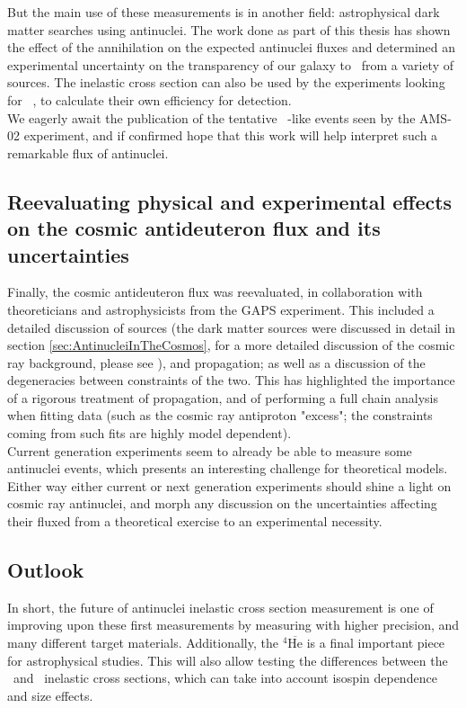 But the main use of these measurements is in another field: astrophysical dark matter searches using antinuclei. The work done as part of this thesis has shown the effect of the annihilation on the expected antinuclei fluxes and determined an experimental uncertainty on the transparency of our galaxy to \ahe\ from a variety of sources. The inelastic cross section can also be used by the experiments looking for \ahe\ , to calculate their own efficiency for detection. \\
We eagerly await the publication of the tentative \ahe\ -like events seen by the AMS-02 experiment, and if confirmed hope that this work will help interpret such a remarkable flux of antinuclei. \\

\subsection{Reevaluating physical and experimental effects on the cosmic antideuteron flux and its uncertainties}

Finally, the cosmic antideuteron flux was reevaluated, in collaboration with theoreticians and astrophysicists from the GAPS experiment. This included a detailed discussion of sources (the dark matter sources were discussed in detail in section \ref{sec:AntinucleiInTheCosmos}, for a more detailed discussion of the cosmic ray background, please see \cite{Serksnyte:2022onw}), and propagation; as well as a discussion of the degeneracies between constraints of the two. This has highlighted the importance of a rigorous treatment of propagation, and of performing a full chain analysis when fitting data (such as the cosmic ray antiproton "excess"; the constraints coming from such fits are highly model dependent). \\

Current generation experiments seem to already be able to measure some antinuclei events, which presents an interesting challenge for theoretical models. Either way either current or next generation experiments should shine a light on cosmic ray antinuclei, and morph any discussion on the uncertainties affecting their fluxed from a theoretical exercise to an experimental necessity. 

\subsection{Outlook}

In short, the future of antinuclei inelastic cross section measurement is one of improving upon these first measurements by measuring with higher precision, and many different target materials. Additionally, the $^4\overline{\mathrm{He}}$ is a final important piece for astrophysical studies. This will also allow testing the differences between the \ahe\ and \atrit\ inelastic cross sections, which can take into account isospin dependence and size effects.  \\

